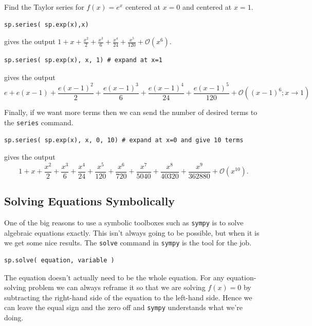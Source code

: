 \begin{example}
    Find the Taylor series for $f(x) = e^x$ centered at $x=0$ and centered at $x=1$.  

\bcode
\begin{lstlisting}
sp.series( sp.exp(x),x)
\end{lstlisting}
gives the output $\displaystyle 1 + x + \frac{x^{2}}{2} + \frac{x^{3}}{6} +
\frac{x^{4}}{24} + \frac{x^{5}}{120} + \mathcal{O}\left(x^{6}\right).$

\bcode
\begin{lstlisting}
sp.series( sp.exp(x), x, 1) # expand at x=1
\end{lstlisting}
gives the output 
\[ e + e \left(x - 1\right) + \frac{e \left(x -
    1\right)^{2}}{2} + \frac{e \left(x - 1\right)^{3}}{6} + \frac{e \left(x -
        1\right)^{4}}{24} + \frac{e \left(x - 1\right)^{5}}{120} + \mathcal{O}\left(\left(x -
    1\right)^{6}; x\rightarrow 1\right) \]

Finally, if we want more terms then we can send the number of desired terms to the
\texttt{series} command.

\bcode
\begin{lstlisting}
sp.series( sp.exp(x), x, 0, 10) # expand at x=0 and give 10 terms
\end{lstlisting}
gives the output
\[ 1 + x + \frac{x^{2}}{2} + \frac{x^{3}}{6} + \frac{x^{4}}{24} + \frac{x^{5}}{120} +
    \frac{x^{6}}{720} + \frac{x^{7}}{5040} + \frac{x^{8}}{40320} +
\frac{x^{9}}{362880} + \mathcal{O}\left(x^{10}\right). \]
\end{example}

\subsection{Solving Equations Symbolically}
One of the big reasons to use a symbolic toolboxes such as \texttt{sympy} is to solve
algebraic equations exactly.  This isn't always going to be possible, but when it is we
get some nice results.  The \texttt{solve} command in \texttt{sympy} is the tool for the job.
\begin{lstlisting}
sp.solve( equation, variable )
\end{lstlisting}
The equation doesn't actually need to be the whole equation.  For any equation-solving
problem we can always reframe it so that we are solving $f(x) = 0$ by subtracting the
right-hand side of the equation to the left-hand side.  Hence we can leave the equal sign
and the zero off and \texttt{sympy} understands what we're doing.

